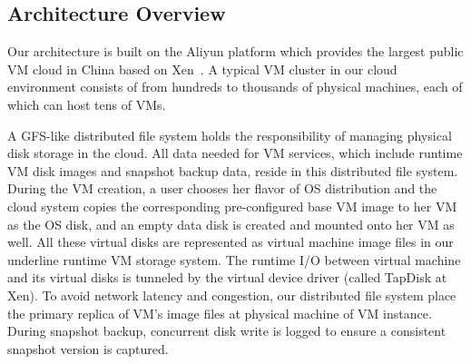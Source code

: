 \subsection{Architecture Overview}
Our architecture is built on the Aliyun platform which provides the largest public VM cloud in China 
based on Xen~\cite{Xen2003}. A typical VM cluster in our cloud environment
consists of from hundreds to thousands of physical machines, each of which can
host tens of VMs.

A GFS-like distributed file system holds the responsibility of managing physical disk storage
in the cloud. All data needed for VM services, which include runtime VM disk images and snapshot backup data,
reside in this distributed file system.
During the VM creation, a user chooses her flavor of OS distribution and the cloud system 
copies the corresponding pre-configured base VM image to her VM as the OS disk, 
and an empty data disk is created and mounted onto her VM as well. 
All these virtual disks are represented as virtual machine image files in our
underline runtime VM storage system. The runtime I/O between virtual machine and its virtual
disks is tunneled by the virtual device driver (called TapDisk\cite{Warfield2005} at Xen). To avoid network latency and congestion, 
our distributed file system place the primary replica of VM's 
image files at physical machine of VM instance.
During snapshot backup, concurrent disk write is logged 
to ensure a consistent snapshot version is captured. 

